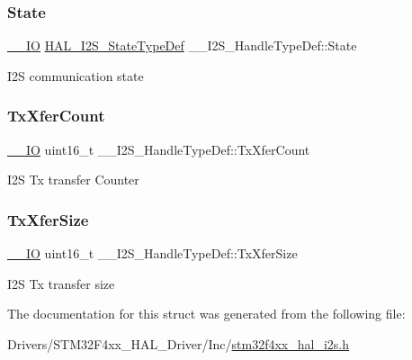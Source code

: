 \subsubsection{\texorpdfstring{State}{State}}
{\footnotesize\ttfamily \hyperlink{core__sc300_8h_aec43007d9998a0a0e01faede4133d6be}{\+\_\+\+\_\+\+IO} \hyperlink{group___i2_s___exported___types_ga2588a0c71baf7cd6d2c1b9b11120bef0}{H\+A\+L\+\_\+\+I2\+S\+\_\+\+State\+Type\+Def} \+\_\+\+\_\+\+I2\+S\+\_\+\+Handle\+Type\+Def\+::\+State}

I2S communication state \mbox{\label{struct_____i2_s___handle_type_def_a450f0ddcbc23f69bb0f0dff274f65306}} 
\subsubsection{\texorpdfstring{Tx\+Xfer\+Count}{TxXferCount}}
{\footnotesize\ttfamily \hyperlink{core__sc300_8h_aec43007d9998a0a0e01faede4133d6be}{\+\_\+\+\_\+\+IO} uint16\+\_\+t \+\_\+\+\_\+\+I2\+S\+\_\+\+Handle\+Type\+Def\+::\+Tx\+Xfer\+Count}

I2S Tx transfer Counter \mbox{\label{struct_____i2_s___handle_type_def_afe629648b19b7f099562294a8cc2c773}} 
\subsubsection{\texorpdfstring{Tx\+Xfer\+Size}{TxXferSize}}
{\footnotesize\ttfamily \hyperlink{core__sc300_8h_aec43007d9998a0a0e01faede4133d6be}{\+\_\+\+\_\+\+IO} uint16\+\_\+t \+\_\+\+\_\+\+I2\+S\+\_\+\+Handle\+Type\+Def\+::\+Tx\+Xfer\+Size}

I2S Tx transfer size 

The documentation for this struct was generated from the following file\+:\begin{DoxyCompactItemize}
\item 
Drivers/\+S\+T\+M32\+F4xx\+\_\+\+H\+A\+L\+\_\+\+Driver/\+Inc/\hyperlink{stm32f4xx__hal__i2s_8h}{stm32f4xx\+\_\+hal\+\_\+i2s.\+h}\end{DoxyCompactItemize}
